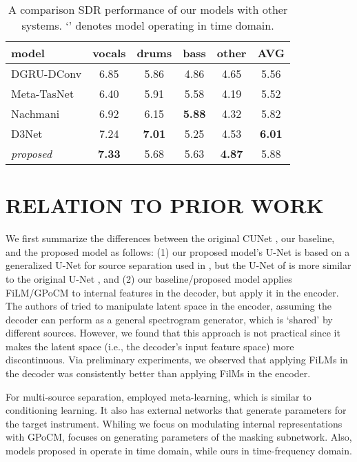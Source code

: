 \documentclass{article}
\begin{document}
\begin{table}[]
\begin{tabular}{l|c|c|c|c|c}
\hline
model             & vocals & drums & bass & other & AVG \\ \hline
DGRU-DConv\cite{dilatedlstm} & 6.85 & 5.86 & 4.86 & 4.65 & 5.56 \\
Meta-TasNet\cite{meta} & 6.40   & 5.91  & 5.58 & 4.19 & 5.52    \\ 
Nachmani\cite{Nachmani} & 6.92 & 6.15 & \textbf{5.88} & 4.32 & 5.82 \\ 
D3Net \cite{d3net} & 7.24   & \textbf{7.01}  & 5.25 & 4.53 & \textbf{6.01}    \\ \hline
\textit{proposed} & \textbf{7.33}  & 5.68  & 5.63 & \textbf{4.87}  & 5.88    \\ \hline
\end{tabular}
    \caption{A comparison SDR performance of our models with other systems. `' denotes model operating in time domain. }
    \label{table:sota}
\end{table}

\section{RELATION TO PRIOR WORK}
We first summarize the differences between the original CUNet \cite{cunet}, our baseline, and the proposed model as follows:
(1) our proposed model's U-Net is based on a generalized U-Net for source separation used in \cite{tfctdf}, but the U-Net of \cite{cunet} is more similar to the original U-Net \cite{medical_unet}, and (2) our baseline/proposed model applies FiLM/GPoCM to internal features in the decoder, but \cite{cunet} apply it in the encoder. The authors of \cite{cunet} tried to manipulate latent space in the encoder, assuming the decoder can perform as a general spectrogram generator, which is `shared' by different sources. 
However, we found that this approach is not practical since it makes the latent space (i.e., the decoder's input feature space) more discontinuous. Via preliminary experiments, we observed that applying FiLMs in the decoder was consistently better than applying FilMs in the encoder.

For multi-source separation, \cite{meta} employed meta-learning, which is similar to conditioning learning. It also has external networks that generate parameters for the target instrument. 
Whiling we focus on modulating internal representations with GPoCM, \cite{meta} focuses on generating parameters of the masking subnetwork.
Also, models proposed in \cite{meta,Nachmani} operate in time domain, while ours in time-frequency domain. 
\end{document}

